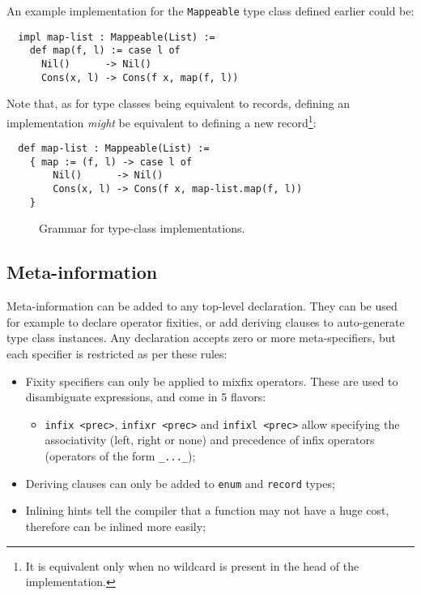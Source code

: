\noindent An example implementation for the \verb|Mappeable| type class defined earlier could be:

\noindent\begin{verbatim}
  impl map-list : Mappeable(List) :=
    def map(f, l) := case l of
      Nil()      -> Nil()
      Cons(x, l) -> Cons(f x, map(f, l))
\end{verbatim}
\vspace*{\baselineskip}

Note that, as for type classes being equivalent to records, defining an implementation \textit{might} be equivalent to defining a new record\footnote{It is equivalent only when no wildcard is present in the head of the implementation.}:

\noindent\begin{verbatim}
  def map-list : Mappeable(List) :=
    { map := (f, l) -> case l of
        Nil()      -> Nil()
        Cons(x, l) -> Cons(f x, map-list.map(f, l))
    }
\end{verbatim}

\begin{figure}[H]
  \centering


  \caption{Grammar for type-class implementations.}
  \label{fig:zilch-grammar-declarations-implementation-grammar}
\end{figure}

\subsection{Meta-information}\label{subsec:zilch-grammar-declarations-meta}

Meta-information can be added to any top-level declaration.
They can be used for example to declare operator fixities, or add deriving clauses to auto-generate type class instances.
Any declaration accepts zero or more meta-specifiers, but each specifier is restricted as per these rules:
\begin{itemize}
  \item Fixity specifiers can only be applied to mixfix operators.
        These are used to disambiguate expressions, and come in 5 flavors:
        \begin{itemize}
          \item \verb|infix <prec>|, \verb|infixr <prec>| and \verb|infixl <prec>| allow specifying the associativity (left, right or none) and precedence of infix operators (operators of the form \verb|_..._|);
        \end{itemize}
  \item Deriving clauses can only be added to \verb|enum| and \verb|record| types;
  \item Inlining hints tell the compiler that a function may not have a huge cost, therefore can be inlined more easily;
\end{itemize}

